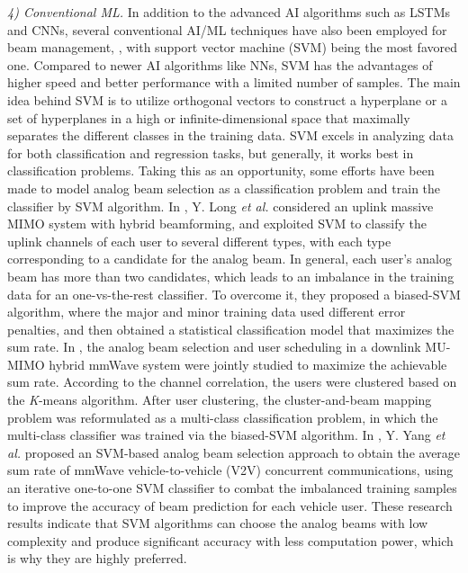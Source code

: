 \documentclass[journal,comsoc]{IEEEtran}
\begin{document}
\emph{4) Conventional ML.} In addition to the advanced AI algorithms such as LSTMs and CNNs, several conventional AI/ML techniques have also been employed for beam management, \cite{Data-Driven-Analog-Beam-Selection-2018,Machine-Learning-Analog-Beam-Selection-2020,Learning-Predictive-Transmitter-Receiver-Beam-Alignment-2021,Machine-Learning-Assisted-Beam-Alignment-2021,Novel-Design-User-Scheduling-Analog-Beam-Selection-2022}, with support vector machine (SVM) being the most favored one. Compared to newer AI algorithms like NNs, SVM has the advantages of higher speed and better performance with a limited number of samples. The main idea behind SVM is to utilize orthogonal vectors to construct a hyperplane or a set of hyperplanes in a high or infinite-dimensional space that maximally separates the different classes in the training data. SVM excels in analyzing data for both classification and regression tasks, but generally, it works best in classification problems. Taking this as an opportunity, some efforts have been made to model analog beam selection as a classification problem and train the classifier by SVM algorithm. In \cite{Data-Driven-Analog-Beam-Selection-2018}, Y. Long \emph{et al.} considered an uplink massive MIMO system with hybrid beamforming, and exploited SVM to classify the uplink channels of each user to several different types, with each type corresponding to a candidate for the analog beam. In general, each user's analog beam has more than two candidates, which leads to an imbalance in the training data for an one-vs-the-rest classifier. To overcome it, they proposed a biased-SVM algorithm, where the major and minor training data used different error penalties, and then obtained a statistical classification model that maximizes the sum rate. In \cite{Novel-Design-User-Scheduling-Analog-Beam-Selection-2022}, the analog beam selection and user scheduling in a downlink MU-MIMO hybrid mmWave system were jointly studied to maximize the achievable sum rate. According to the channel correlation, the users were clustered based on the \emph{K}-means algorithm. After user clustering, the cluster-and-beam mapping problem was reformulated as a multi-class classification problem, in which the multi-class classifier was trained via the biased-SVM algorithm. In \cite{Machine-Learning-Analog-Beam-Selection-2020}, Y. Yang \emph{et al.} proposed an SVM-based analog beam selection approach to obtain the average sum rate of mmWave vehicle-to-vehicle (V2V) concurrent communications, using an iterative one-to-one SVM classifier to combat the imbalanced training samples to improve the accuracy of beam prediction for each vehicle user. These research results indicate that SVM algorithms can choose the analog beams with low complexity and produce significant accuracy with less computation power, which is why they are highly preferred.
\end{document}
